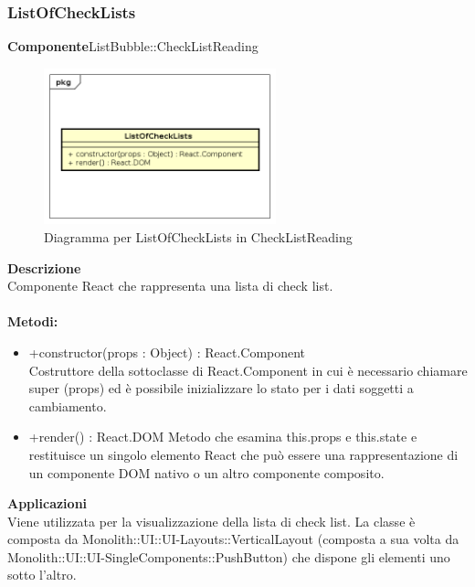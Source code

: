 \clearpage

\subsubsection{ListOfCheckLists}
\textbf{Componente}ListBubble::CheckListReading\\
   \FloatBarrier
   \begin{figure}[ht]
   \centering
   \includegraphics[width=0.6\textwidth]{img/single-ListOfCheckLists}
   \caption{{Diagramma per ListOfCheckLists in CheckListReading}}
\end{figure}
\FloatBarrier
\textbf{Descrizione}\\
Componente React che rappresenta una lista di check list.
\\
\\
\textbf{Metodi:} 
\begin{itemize}
\item +constructor(props : Object) : React.Component 
\\
Costruttore della sottoclasse di React.Component in cui è necessario chiamare super (props) ed è possibile inizializzare lo stato per i dati soggetti a cambiamento.

\item +render() : React.DOM
Metodo che esamina this.props e this.state e restituisce un singolo elemento React che può essere una rappresentazione di un componente DOM nativo o un altro componente composito.

\end{itemize} 


\textbf{Applicazioni}\\
Viene utilizzata per la visualizzazione della lista di check list.
La classe è composta da Monolith::UI::UI-Layouts::VerticalLayout (composta a sua volta da Monolith::UI::UI-SingleComponents::PushButton) che dispone gli elementi uno sotto l'altro. 


\clearpage

